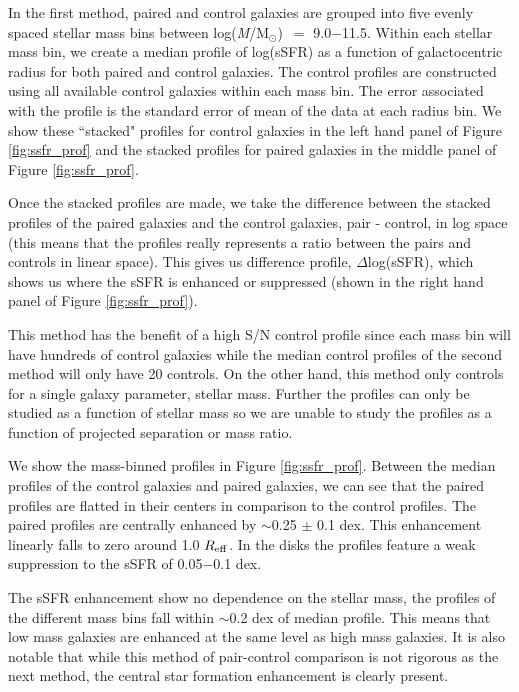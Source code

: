 \documentclass[iop,revtex4,twocolumn,apj,numberedappendix,appendixfloats]{emulateapj}
\newcommand{\reff}{$R_{\rm eff}$}
\newcommand{\logm}{log({\it M}/M$_{\odot}$)}
\begin{document}
In the first method, paired and control galaxies are grouped into five evenly spaced stellar mass bins between \logm\ $=$ 9.0$-$11.5. Within each stellar mass bin, we create a median profile of log(sSFR) as a function of galactocentric radius for both paired and control galaxies. The control profiles are constructed using all available control galaxies within each mass bin. The error associated with the profile is the standard error of mean of the data at each radius bin. We show these ``stacked" profiles for control galaxies in the left hand panel of Figure \ref{fig:ssfr_prof} and the stacked profiles for paired galaxies in the middle panel of Figure \ref{fig:ssfr_prof}.

Once the stacked profiles are made, we take the difference between the stacked profiles of the paired galaxies and the control galaxies, pair - control, in log space (this means that the profiles really represents a ratio between the pairs and controls in linear space). This gives us difference profile, $\Delta$log(sSFR), which shows us where the sSFR is enhanced or suppressed (shown in the right hand panel of Figure \ref{fig:ssfr_prof}). 

This method has the benefit of a high S/N control profile since each mass bin will have hundreds of control galaxies while the median control profiles of the second method will only have 20 controls. On the other hand, this method only controls for a single galaxy parameter, stellar mass. Further the profiles can only be studied as a function of stellar mass so we are unable to study the profiles as a function of projected separation or mass ratio. 

We show the mass-binned profiles in Figure \ref{fig:ssfr_prof}. Between the median profiles of the control galaxies and paired galaxies, we can see that the paired profiles are flatted in their centers in comparison to the control profiles. The paired profiles are centrally enhanced by $\sim$0.25 $\pm$ 0.1 dex. This enhancement linearly falls to zero around 1.0 \reff. In the disks the profiles feature a weak suppression to the sSFR of 0.05$-$0.1 dex. 

The sSFR enhancement show no dependence on the stellar mass, the profiles of the different mass bins fall within $\sim$0.2 dex of median profile. This means that low mass galaxies are enhanced at the same level as high mass galaxies. It is also notable that while this method of pair-control comparison is not rigorous as the next method, the central star formation enhancement is clearly present.
\end{document}
